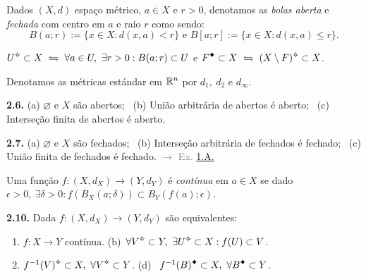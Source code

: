 \begin{definition}
    Dados \((X,d)\) espaço métrico, \(a \in X\) e \(r>0\), denotamos as  \emph{bolas aberta} e \emph{fechada} com centro em \(a\) e raio \(r\) como sendo:
    \[B(a;r) := \{x \in X : d(x,a)< r\} \text{ \ \ e \ \ }B[a;r]:= \{x\in X : d(x,a) \leq r\}.\]  
\end{definition}
\vspace{-0.5cm}
\begin{definition}
    \(U\ab \subset X \ \leftrightharpoons \ \forall a \in U, \ \exists r>0 : B(a;r)\subset U\) e \(F\ce\subset X \ \leftrightharpoons \ (X \setminus F)\ab \subset X\).
\end{definition}

\begin{note} 
    Denotamos as métricas estándar em \(\mathbb{R}^n\) por \(d_1, \ d_2\) e \( d_\infty\).  
\end{note}

\begin{proposition}
    \textbf{2.6.} (a) \(\varnothing\) e \(X\) são abertos; \ (b) União arbitrária de abertos é aberto; \ (c) Interseção finita de abertos é aberto. 
\end{proposition}

\newcommand{\comentario}[1]{\textcolor{gray}{\(\rightarrow\) #1}}
\hypertarget{coro27}{}
\begin{corollary}
    \textbf{2.7.} (a) \(\varnothing\) e \(X\) são fechados; \ (b) Interseção arbitrária de fechados é fechado; \ (c) União finita de fechados é fechado. \comentario{Ex. \hyperlink{demorgan}{1.A.}} 
\end{corollary}

\begin{definition}
    Uma função \(f: (X,d_X) \to (Y,d_Y)\) é \emph{contínua} em \(a \in X \) se dado \(\epsilon > 0, \ \exists \delta > 0 : f(B_X(a;\delta)) \subset B_Y(f(a); \epsilon)\). 
\end{definition}

\begin{proposition}
    \textbf{2.10.} Dada \(f: (X,d_X)\to (Y,d_Y)\) são equivalentes:
    \vspace{-0.3cm}
    \begin{enumerate}[label = (\alph*), left = 0.6cm]
        \item \(f:X\to Y\) contínua. \hfill (b)\ \(\forall V\ab \subset Y, \ \exists U\ab \subset X : f(U) \subset V\).  
        \item[(c)] \(f^{-1}(V)\ab \subset X, \ \forall V\ab \subset Y\).  \hspace{2.25cm} (d) \ \(f^{-1}(B)\ce \subset X, \ \forall B\ce \subset Y\).
    \end{enumerate}
\end{proposition}


